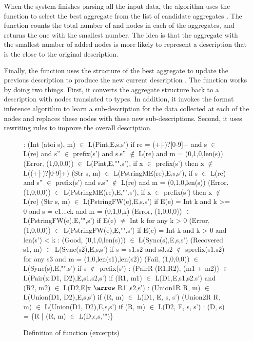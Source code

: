 When the system finishes parsing all the
input data, the algorithm uses the  function to
select the best aggregate from the list of candidate aggregates
.  The  function counts the total number of
 and  nodes in each of the aggregates, and returns
the one with the smallest number.
The idea is that the aggregate with the smallest number of added nodes is 
more likely to represent a description
that is the close to the original description. 

Finally, the  function uses the structure of the best
aggregate to update the previous description  to produce the new
current description .  The  function works by
doing two things.
First, it converts the aggregate structure back to a \pads{} description
with  nodes translated to  types. In addition,
it invokes the \learnpads{} format inference
algorithm to learn a sub-description for the data collected 
at each of the  nodes
and replaces these  nodes with these new sub-descriptions. 
Second, it uses rewriting
rules to improve the overall description.

\begin{figure}[t]
{\small
\begin{code}
\cdmath\small
{}:
(Int (atoi s), m) $\in$ L(Pint,E,s,s')
  if re = (+|-)?[0-9]+
  and s $\in$ L(re) 
  and s'' $\in$ prefix(s') and s.s'' $\not\in$ L(re)
  and m = (0,1,0,len(s))
(Error, (1,0,0,0)) $\in$ L(Pint,E,"",s'),
  if x $\in$ prefix(s') then x $\not\in$ L((+|-)?[0-9]+) 
(Str s, m) $\in$ L(PstringME(re),E,s,s'),
  if s $\in$ L(re) 
  and s'' $\in$ prefix(s') and s.s'' $\not\in$ L(re) 
  and m = (0,1,0,len(s)) 
(Error, (1,0,0,0)) $\in$ L(PstringME(re),E,"",s'), 
  if x $\in$ prefix(s') then x $\not\in$ L(re)
(Str s, m) $\in$ L(PstringFW(e),E,s,s') 
  if E(e) = Int k and k >= 0
  and s = c1...ck and m = (0,1,0,k)
(Error, (1,0,0,0)) $\in$ L(PstringFW(e),E,"",s') 
  if E(e) $\ne$ Int k for any k > 0
(Error, (1,0,0,0)) $\in$ L(PstringFW(e),E,"",s') 
  if E(e) = Int k and k > 0 and len(s') < k
\mbox{}
:
(Good, (0,1,0,len(s))) $\in$ L(Sync(s),E,s,s')
(Recovered s1, m) $\in$ L(Sync(s2),E,s,s')
  if s = s1.s2 
  and s3.s2 $\not\in$ sprefix(s1.s2) for any s3
  and m = (1,0,len(s1),len(s2))
(Fail, (1,0,0,0)) $\in$ L(Sync(s),E,"",s')
  if s $\not\in$ prefix(s')
\mbox{}
:
(PairR (R1,R2), (m1 + m2)) 
        $\in$ L(Pair(x:D1, D2),E,s1.s2,s')
  if  (R1, m1) $\in$ L(D1,E,s1,s2.s')
  and (R2, m2) $\in$ L(D2,E[x $\arrow$ R1],s2,s')
\mbox{}
:
(Union1R R, m) $\in$ L(Union(D1, D2),E,s,s')
  if (R, m) $\in$ L(D1, E, s, s')
(Union2R R, m) $\in$ L(Union(D1, D2),E,s,s')
  if (R, m) $\in$ L(D2, E, s, s')
\mbox{}
:
(D, s) = \{R | (R, m) $\in$ L(D,$\epsilon$,s,"")\} 
\end{code}
}
\caption{Definition of  function (excerpts)}
\label{fig:parse-sem}
\end{figure}

